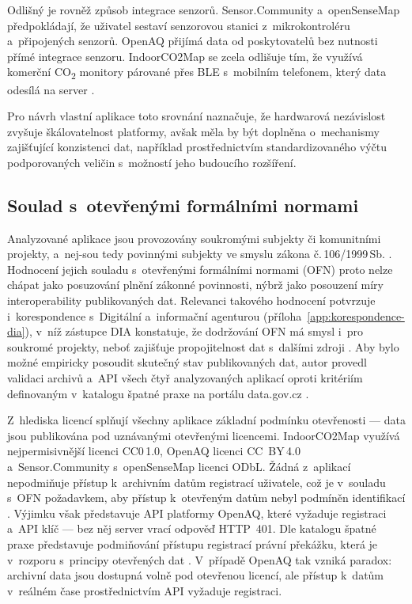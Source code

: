 Odlišný je rovněž způsob integrace senzorů. Sensor.Community a~openSenseMap předpokládají, že uživatel sestaví senzorovou stanici z~mikrokontroléru a~připojených senzorů. OpenAQ přijímá data od poskytovatelů bez nutnosti přímé integrace senzoru. IndoorCO2Map se zcela odlišuje tím, že využívá komerční CO\textsubscript{2} monitory párované přes BLE s~mobilním telefonem, který data odesílá na server \parencite{aurelwuAurelWuIndoorCO2MapApp2026}.

Pro návrh vlastní aplikace toto srovnání naznačuje, že hardwarová nezávislost zvyšuje škálovatelnost platformy, avšak měla by být doplněna o~mechanismy zajišťující konzistenci dat, například prostřednictvím standardizovaného výčtu podporovaných veličin s~možností jeho budoucího rozšíření.

\FloatBarrier
\subsection{Soulad s~otevřenými formálními normami}
\label{subsec:soulad-ofn}

Analyzované aplikace jsou provozovány soukromými subjekty či komunitními projekty, a~nej-sou tedy povinnými subjekty ve smyslu zákona č.\,106/1999\,Sb. \parencite{Zakon1061999}. Hodnocení jejich souladu s~otevřenými formálními normami (OFN) proto nelze chápat jako posuzování plnění zákonné povinnosti, nýbrž jako posouzení míry interoperability publikovaných dat. Relevanci takového hodnocení potvrzuje i~korespondence s~Digitální a~informační agenturou (příloha~\ref{app:korespondence-dia}), v~níž zástupce DIA konstatuje, že dodržování OFN má smysl i~pro soukromé projekty, neboť zajišťuje propojitelnost dat s~dalšími zdroji \parencite{OtevreneFormalniNormy}. Aby bylo možné empiricky posoudit skutečný stav publikovaných dat, autor provedl validaci archivů a~API všech čtyř analyzovaných aplikací oproti kritériím definovaným v~katalogu špatné praxe na portálu data.gov.cz \parencite{PrikladySpatnePraxe2022}.

Z~hlediska licencí splňují všechny aplikace základní podmínku otevřenosti --- data jsou publikována pod uznávanými otevřenými licencemi. IndoorCO2Map využívá nejpermisivnější licenci CC0\,1.0, OpenAQ licenci CC~BY\,4.0 a~Sensor.Community s~openSenseMap licenci ODbL. Žádná z~aplikací nepodmiňuje přístup k~archivním datům registrací uživatele, což je v~souladu s~OFN požadavkem, aby přístup k~otevřeným datům nebyl podmíněn identifikací \parencite{PrikladySpatnePraxe2022}. Výjimku však představuje API platformy OpenAQ, které vyžaduje registraci a~API klíč --- bez něj server vrací odpověď HTTP~401. Dle katalogu špatné praxe představuje podmiňování přístupu registrací právní překážku, která je v~rozporu s~principy otevřených dat \parencite{PrikladySpatnePraxe2022}. V~případě OpenAQ tak vzniká paradox: archivní data jsou dostupná volně pod otevřenou licencí, ale přístup k~datům v~reálném čase prostřednictvím API vyžaduje registraci.

